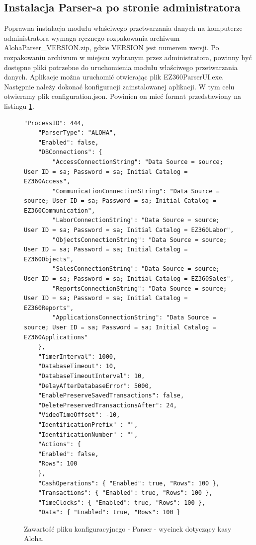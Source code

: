 \documentclass[a4paper]{book}
\begin{document}
\subsection{Instalacja Parser-a po stronie administratora}
Poprawna instalacja modułu właściwego przetwarzania danych na komputerze administratora wymaga ręcznego rozpakowania archiwum AlohaParser\_VERSION.zip, gdzie VERSION jest numerem wersji. Po rozpakowaniu archiwum w miejscu wybranym przez administratora, powinny być dostępne pliki potrzebne do uruchomienia modułu właściwego przetwarzania danych.
Aplikacje można uruchomić otwierając plik EZ360ParserUI.exe.
Następnie należy dokonać konfiguracji zainstalowanej aplikacji. W tym celu otwieramy plik configuration.json. Powinien on mieć format przedstawiony na listingu \ref{lst:przykladowyPlikKonfiguracyjnyParser}.
\begin{figure}[t]
	\begin{lstlisting}[frame=single, breaklines=true]
	"ProcessID": 444,
	"ParserType": "ALOHA",
	"Enabled": false,
	"DBConnections": {
		"AccessConnectionString": "Data Source = source; User ID = sa; Password = sa; Initial Catalog = EZ360Access",
		"CommunicationConnectionString": "Data Source = source; User ID = sa; Password = sa; Initial Catalog = EZ360Communication",
		"LaborConnectionString": "Data Source = source; User ID = sa; Password = sa; Initial Catalog = EZ360Labor",
		"ObjectsConnectionString": "Data Source = source; User ID = sa; Password = sa; Initial Catalog = EZ360Objects",
		"SalesConnectionString": "Data Source = source; User ID = sa; Password = sa; Initial Catalog = EZ360Sales",
		"ReportsConnectionString": "Data Source = source; User ID = sa; Password = sa; Initial Catalog = EZ360Reports",      
		"ApplicationsConnectionString": "Data Source = source; User ID = sa; Password = sa; Initial Catalog = EZ360Applications"
	},
	"TimerInterval": 1000,
	"DatabaseTimeout": 10,
	"DatabaseTimeoutInterval": 10,
	"DelayAfterDatabaseError": 5000,
	"EnablePreserveSavedTransactions": false,
	"DeletePreservedTransactionsAfter": 24,
	"VideoTimeOffset": -10,
	"IdentificationPrefix" : "",
	"IdentificationNumber" : "",
	"Actions": {
	"Enabled": false,
	"Rows": 100
	},
	"CashOperations": { "Enabled": true, "Rows": 100 },
	"Transactions": { "Enabled": true, "Rows": 100 },
	"TimeClocks": { "Enabled": true, "Rows": 100 },
	"Data": { "Enabled": true, "Rows": 100 }
	\end{lstlisting}
	\caption{Zawartość pliku konfiguracyjnego - Parser - wycinek dotyczący kasy Aloha.}
	\label{lst:przykladowyPlikKonfiguracyjnyParser}
\end{figure}
\end{document}
